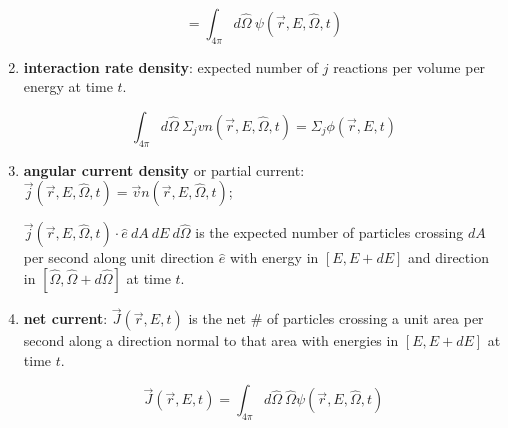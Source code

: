 \documentclass[12pt]{article}
\newcommand{\vOmega}{\ensuremath{\hat{\Omega}}}
\begin{document}
\begin{enumerate}
\[= \int_{4\pi} d\vOmega\: \psi(\vec{r}, E, \vOmega, t) \]

\item \textbf{interaction rate density}: expected number of $j$ reactions per 
volume per energy at time $t$.

\[\int_{4\pi} d\vOmega \:\Sigma_j v n(\vec{r}, E, \vOmega, t) =
\Sigma_j \phi(\vec{r},E,t)\]

\item \textbf{angular current density} or partial current:
      $\vec{j}(\vec{r}, E, \vOmega, t) = \vec{v} n(\vec{r}, E, \vOmega, t)$; 

$\vec{j}(\vec{r}, E, \vOmega, t) \cdot \hat{e}\: dA\: dE\: d\vOmega$ is the 
expected number of particles crossing $dA$ per second along unit direction
$\hat{e}$ with energy in $[E, E + dE]$ and direction in
$[\vOmega, \vOmega + d\vOmega]$ at time $t$.

\item \textbf{net current}: $\vec{J}(\vec{r}, E, t) $ is the net \# of 
      particles crossing a unit area per second along a direction normal to 
      that area with energies in $[E, E + dE]$ at time $t$.

\[\vec{J}(\vec{r}, E, t) = \int_{4\pi} d\vOmega\:
\vOmega \psi(\vec{r}, E, \vOmega, t)\]

\end{enumerate}
\end{document}
